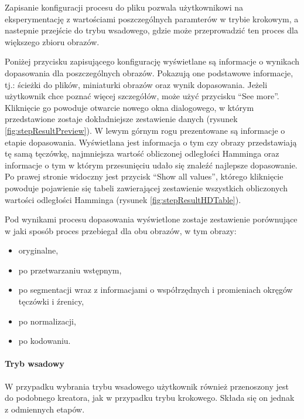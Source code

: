 Zapisanie konfiguracji procesu do pliku pozwala użytkownikowi na eksperymentację z wartościami poszczególnych
paramterów w trybie krokowym, a nastepnie przejście do trybu wsadowego, gdzie może przeprowadzi\'c ten proces
dla większego zbioru obrazów.\newline

Poniżej przycisku zapisującego konfigurację wyświetlane są informacje o wynikach dopasowania
dla poszczególnych obrazów. Pokazują one podstawowe informacje, tj.: ścieżki do plików,
miniaturki obrazów oraz wynik dopasowania. Jeżeli użytkownik chce pozna\'c więcej szczegółów, może
uży\'c przycisku ``See more''. Kliknięcie go powoduje otwarcie nowego okna dialogowego, w którym
przedstawione zostaje dokładniejsze zestawienie danych (rysunek \ref{fig:stepResultPreview}).
W lewym górnym rogu prezentowane są informacje o etapie dopasowania. Wyświetlana jest informacja
o tym czy obrazy przedstawiają tę samą tęczówkę, najmniejsza wartoś\'c obliczonej odległości Hamminga
oraz informacje o tym w którym przesunięciu udało się znale\'z\'c najlepsze dopasowanie.
Po prawej stronie widoczny jest przycisk ``Show all values'', którego kliknięcie powoduje
pojawienie się tabeli zawierającej zestawienie wszystkich obliczonych wartości odległości Hamminga
(rysunek \ref{fig:stepResultHDTable}).

Pod wynikami procesu dopasowania wyświetlone zostaje zestawienie porównujące w jaki sposób
proces przebiegał dla obu obrazów, w tym obrazy:

\begin{itemize}
  \item oryginalne,
  \item po przetwarzaniu wstępnym,
  \item po segmentacji wraz z informacjami o współrzędnych i promieniach okręgów tęczówki i \'zrenicy,
  \item po normalizacji,
  \item po kodowaniu.
\end{itemize}

\paragraph{Tryb wsadowy\newline}

W przypadku wybrania trybu wsadowego użytkownik również przenoszony jest do podobnego kreatora,
jak w przypadku trybu krokowego. Składa się on jednak z odmiennych etapów.\newline

